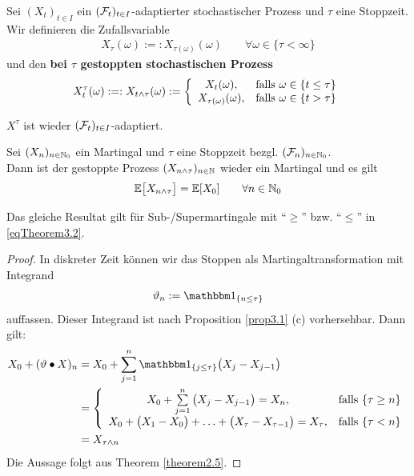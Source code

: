 \begin{defi}
	Sei $(X_t)_{t\in I}$ ein $(\mathcal{F}_t)_{t\in I}$-adaptierter stochastischer Prozess und $\tau$ eine Stoppzeit. Wir definieren die Zufallsvariable
	\begin{align*}
		X_\tau(\omega):=:X_{\tau(\omega)}(\omega)\qquad\forall \omega\in\lbrace\tau<\infty\rbrace
	\end{align*} 
	und den \textbf{bei $\tau$ gestoppten stochastischen Prozess}
	\begin{align*}
		X_t^\tau(\omega):=:X_{t\wedge\tau}(\omega):=\left\lbrace\begin{array}{cl}
			X_t(\omega), & \text{falls } \omega\in\lbrace t\leq\tau\rbrace\\
			X_{\tau(\omega)}(\omega), &\text{falls }\omega\in\lbrace t>\tau\rbrace
		\end{array}\right.
	\end{align*}
\end{defi}

\begin{bemerkung}
	$X^\tau$ ist wieder $(\mathcal{F}_t)_{t\in I}$-adaptiert.
\end{bemerkung}

\begin{theorem}\label{theorem3.2}
	Sei $(X_n)_{n\in\mathbb{N}_0}$ ein Martingal und $\tau$ eine Stoppzeit bezgl. $(\mathcal{F}_n)_{n\in\mathbb{N}_0}$.\\
	Dann ist der gestoppte Prozess $(X_{n\wedge\tau})_{n\in\mathbb{N}}$ wieder ein Martingal und es gilt
	\begin{align}\label{eqTheorem3.2}
		\mathbb{E}\big[X_{n\wedge\tau}\big]=\mathbb{E}[X_0]\qquad\forall n\in\mathbb{N}_0
	\end{align}
\end{theorem}

\begin{bemerkung}
	Das gleiche Resultat gilt für Sub-/Supermartingale mit ``$\geq$'' bzw. ``$\leq$'' in \eqref{eqTheorem3.2}.
\end{bemerkung}

\begin{proof}
	In diskreter Zeit können wir das Stoppen als Martingaltransformation mit Integrand
	\begin{align*}
		\vartheta_n:=\indi_{\lbrace n\leq\tau\rbrace}
	\end{align*}
	auffassen. Dieser Integrand ist nach Proposition \ref{prop3.1} (c) vorhersehbar. Dann gilt:
	\begin{align*}
		X_0+(\vartheta\bullet X)_n&=
		X_0+\sum\limits_{j=1}^n\indi_{\lbrace j\leq\tau\rbrace}\big(X_j-X_{j-1}\big)\\
		&=\left\lbrace\begin{array}{cl}
			X_0+\sum\limits_{j=1}^n\big(X_j-X_{j-1}\big)=X_n,&\falls\lbrace\tau\geq n\rbrace\\
			X_0+\big(X_1-X_0\big)+\ldots+\big(X_\tau-X_{\tau-1}\big)=X_\tau, &\falls \lbrace\tau<n\rbrace
		\end{array}\right.\\
		&=X_{\tau\wedge n}
	\end{align*}
	Die Aussage folgt aus Theorem \ref{theorem2.5}.
\end{proof}

